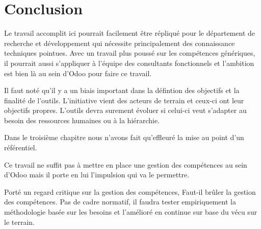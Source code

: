 \chapter*{Conclusion}
Le travail accomplit ici pourrait facilement être répliqué pour le département de recherche et développement qui nécessite principalement des connaissance techniques pointues. Avec un travail plus poussé sur les compétences génériques, il pourrait aussi s'appliquer à l'équipe des consultants fonctionnels et l'ambition est bien là au sein d'Odoo pour faire ce travail. 

Il faut noté qu'il y a un biais important dans la défintion des objectifs et la finalité de l'outils. L'initiative vient des acteurs de terrain et ceux-ci ont leur objectifs propres. L'outils devra surement évoluer si celui-ci veut s'adapter au besoin des ressources humaines ou à la hiérarchie. 

Dans le troisième chapitre nous n'avons fait qu'effleuré la mise au point d'un référentiel.

Ce travail ne suffit pas à mettre en place une gestion des compétences au sein d'Odoo mais il porte en lui l'impulsion qui va le permettre.  

Porté un regard critique sur la gestion des compétences, Faut-il brûler la gestion des compétences. Pas de cadre normatif, il faudra tester empiriquement la méthodologie basée sur les besoins et l'amélioré en continue sur base du vécu sur le terrain.\citep[pp.252-253]{competencesbruler2006}
